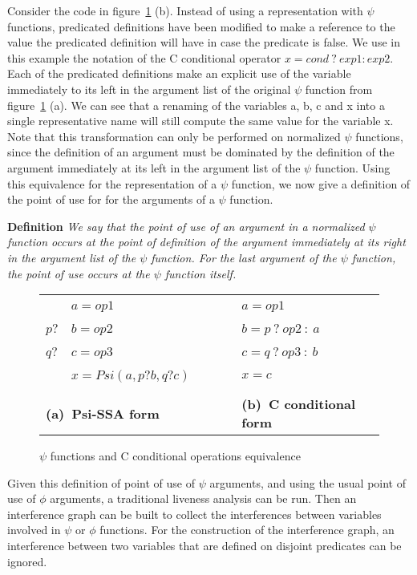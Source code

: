 Consider the code in figure~\ref{fig:psi_ccond} (b). Instead of using
a representation with $\psi$ functions, predicated definitions have
been modified to make a reference to the value the predicated
definition will have in case the predicate is false. We use in this
example the notation of the C conditional operator ${x =
  cond\ ?\ exp1 : exp2}$. Each of the predicated definitions make an
explicit use of the variable immediately to its left in the argument
list of the original $\psi$ function from figure~\ref{fig:psi_ccond}
(a). We can see that a renaming of the variables {a}, {b},
{c} and {x} into a single representative name will still
compute the same value for the variable {x}. Note that this
transformation can only be performed on normalized $\psi$ functions,
since the definition of an argument must be dominated by the
definition of the argument immediately at its left in the argument
list of the $\psi$ function. Using this equivalence for the
representation of a $\psi$ function, we now give a definition of the
point of use for for the arguments of a $\psi$ function.

{\bf Definition} {\em We say that the point of use of an argument in a
  normalized $\psi$ function occurs at the point of definition of the
  argument immediately at its right in the argument list of the $\psi$
  function. For the last argument of the $\psi$ function, the point of
  use occurs at the $\psi$ function itself. }

\begin{figure}
\begin{center}
\footnotesize
\begin{tabular}{llll}
           & ${a = op1}$ & \ \ \ \ & ${a = op1}$ \\
${p?}$ & ${b = op2}$ & \ \ \ \ & ${b = p\ ?\ op2\ :\ a}$ \\
${q?}$ & ${c = op3}$ & \ \ \ \ & ${c = q\ ?\ op3\ :\ b}$ \\
           & ${x = Psi(a,p?b,q?c)}$ & \ \ \ \ & ${x = c}$ \\
\\
\multicolumn{2}{l}{{\bf (a)\ Psi-SSA form}} & \ \ \ \ & {{\bf (b)\ C conditional form}}
\end{tabular}
\caption{$\psi$ functions and C conditional operations equivalence}
\label{fig:psi_ccond}
\end{center}
\end{figure}

Given this definition of point of use of $\psi$ arguments, and using
the usual point of use of $\phi$ arguments, a traditional liveness
analysis can be run. Then an interference graph can be built to
collect the interferences between variables involved in $\psi$ or
$\phi$ functions. For the construction of the interference graph, an
interference between two variables that are defined on disjoint
predicates can be ignored.

